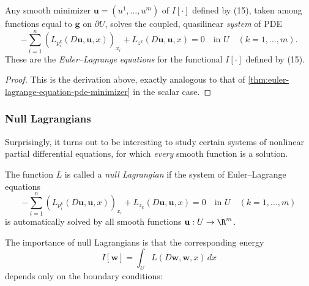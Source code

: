 \begin{theorem}
\label{thm:euler-lagrange-system-pde-minimizer}
Any smooth minimizer $\mathbf{u} = (u^1,\ldots,u^m)$ of $I[\cdot]$ defined by (15), taken among functions equal to $\mathbf{g}$ on $\partial U$, solves the coupled, quasilinear \textit{system} of PDE
\[
-\sum_{i=1}^n \left( L_{p_i^k}(D\mathbf{u}, \mathbf{u}, x) \right)_{x_i} + L_{z^k}(D\mathbf{u}, \mathbf{u}, x) = 0 \quad \text{in } U \quad (k = 1, \ldots, m).
\]
These are the \textit{Euler--Lagrange equations} for the functional $I[\cdot]$ defined by (15).
\end{theorem}
\begin{proof}
This is the derivation above, exactly analogous to that of \cref{thm:euler-lagrange-equation-pde-minimizer} in the scalar case.
\end{proof}

\subsubsection{Null Lagrangians}

Surprisingly, it turns out to be interesting to study certain systems of nonlinear partial differential equations, for which \textit{every} smooth function is a solution.

\begin{definition}
\label{def:null-lagrangian}
The function $L$ is called a \textit{null Lagrangian} if the system of Euler--Lagrange equations
\[
-\sum_{i=1}^{n} (L_{p_i^k}(D\mathbf{u}, \mathbf{u}, x))_{x_i} + L_{z_k}(D\mathbf{u}, \mathbf{u}, x) = 0 \quad \text{in } U \quad (k = 1, \ldots, m)
\tag{17}
\]
is automatically solved by all smooth functions $\mathbf{u} : U \to \R^m$.
\end{definition}

The importance of null Lagrangians is that the corresponding energy
\[
I[\mathbf{w}] = \int_U L(D\mathbf{w}, \mathbf{w}, x) \, dx
\]
depends only on the boundary conditions:

